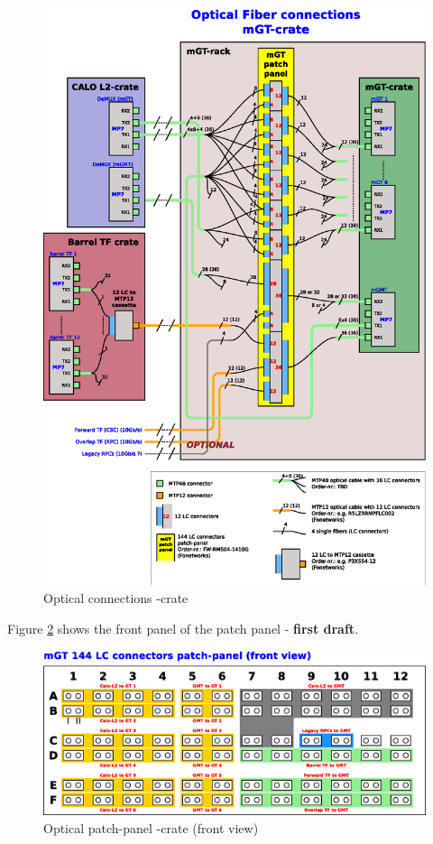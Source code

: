 \begin{figure}[htb]
\centering
\includegraphics[width=14cm]{figures/mGT_mGMT_optical_connections}
\caption{Optical connections \ugt-crate} 
\label{fig:com-hard:mGT_mGMT_fiber_optical_patch}
\end{figure}

\clearpage

Figure \ref{fig:com-hard:mGT_mGMT_144_LC_patch_panel} shows the front panel of the patch panel - \textbf{first draft}.

\begin{figure}[htb]
\centering
\includegraphics[width=14cm]{figures/mGT_mGMT_144_LC_patch_panel}
\caption{Optical patch-panel \ugt-crate (front view)} 
\label{fig:com-hard:mGT_mGMT_144_LC_patch_panel}
\end{figure}

